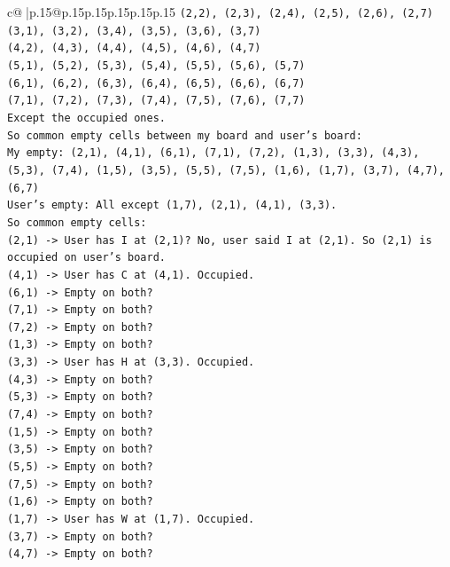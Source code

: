 \documentclass{article}
\begin{document}
{\begin{supertabular}{c@{$\;$}|p{.15\linewidth}@{}p{.15\linewidth}p{.15\linewidth}p{.15\linewidth}p{.15\linewidth}p{.15\linewidth}}
{{{\texttt{(2,2), (2,3), (2,4), (2,5), (2,6), (2,7)} \\
\texttt{(3,1), (3,2), (3,4), (3,5), (3,6), (3,7)} \\
\texttt{(4,2), (4,3), (4,4), (4,5), (4,6), (4,7)} \\
\texttt{(5,1), (5,2), (5,3), (5,4), (5,5), (5,6), (5,7)} \\
\texttt{(6,1), (6,2), (6,3), (6,4), (6,5), (6,6), (6,7)} \\
\texttt{(7,1), (7,2), (7,3), (7,4), (7,5), (7,6), (7,7)} \\
\texttt{Except the occupied ones.} \\
\texttt{So common empty cells between my board and user's board:} \\
\texttt{My empty: (2,1), (4,1), (6,1), (7,1), (7,2), (1,3), (3,3), (4,3), (5,3), (7,4), (1,5), (3,5), (5,5), (7,5), (1,6), (1,7), (3,7), (4,7), (6,7)} \\
\texttt{User's empty: All except (1,7), (2,1), (4,1), (3,3).} \\
\texttt{So common empty cells:} \\
\texttt{(2,1) {-}> User has I at (2,1)? No, user said I at (2,1). So (2,1) is occupied on user's board.} \\
\texttt{(4,1) {-}> User has C at (4,1). Occupied.} \\
\texttt{(6,1) {-}> Empty on both?} \\
\texttt{(7,1) {-}> Empty on both?} \\
\texttt{(7,2) {-}> Empty on both?} \\
\texttt{(1,3) {-}> Empty on both?} \\
\texttt{(3,3) {-}> User has H at (3,3). Occupied.} \\
\texttt{(4,3) {-}> Empty on both?} \\
\texttt{(5,3) {-}> Empty on both?} \\
\texttt{(7,4) {-}> Empty on both?} \\
\texttt{(1,5) {-}> Empty on both?} \\
\texttt{(3,5) {-}> Empty on both?} \\
\texttt{(5,5) {-}> Empty on both?} \\
\texttt{(7,5) {-}> Empty on both?} \\
\texttt{(1,6) {-}> Empty on both?} \\
\texttt{(1,7) {-}> User has W at (1,7). Occupied.} \\
\texttt{(3,7) {-}> Empty on both?} \\
\texttt{(4,7) {-}> Empty on both?} \\
}}}
\end{supertabular}}
\end{document}
